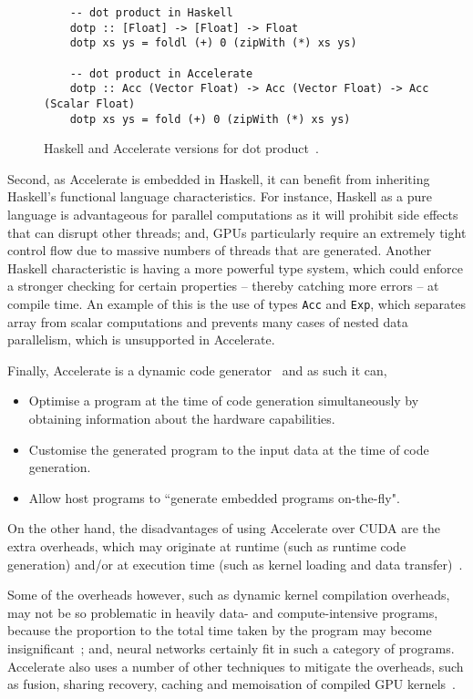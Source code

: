 \begin{figure}
  \begin{lstlisting}
    -- dot product in Haskell
    dotp :: [Float] -> [Float] -> Float
    dotp xs ys = foldl (+) 0 (zipWith (*) xs ys)
           
    -- dot product in Accelerate
    dotp :: Acc (Vector Float) -> Acc (Vector Float) -> Acc (Scalar Float)
    dotp xs ys = fold (+) 0 (zipWith (*) xs ys)
  \end{lstlisting}
  \caption{Haskell and Accelerate versions for dot product~\cite{McD13}.}
  \label{fig:dotp}
\end{figure}

Second, as Accelerate is embedded in Haskell, it can benefit from inheriting Haskell's functional language characteristics. For instance, Haskell as a pure language is advantageous for parallel computations as it will prohibit side effects that can disrupt other threads; and, GPUs particularly require an extremely tight control flow due to massive numbers of threads that are generated. Another Haskell characteristic is having a more powerful type system, which could enforce a stronger checking for certain properties -- thereby catching more errors -- at compile time. An example of this is the use of types \texttt{Acc} and \texttt{Exp}, which separates array from scalar computations and prevents many cases of nested data parallelism, which is unsupported in Accelerate.

Finally, Accelerate is a dynamic code generator~\cite{ChaKelLee11} and as such it can,
\begin{itemize}
\item Optimise a program at the time of code generation simultaneously by obtaining information about the hardware capabilities.
\item Customise the generated program to the input data at the time of code generation.
\item Allow host programs to ``generate embedded programs on-the-fly".
\end{itemize}

On the other hand, the disadvantages of using Accelerate over CUDA are the extra overheads, which may originate at runtime (such as runtime code generation) and/or at execution time (such as kernel loading and data transfer)~\cite{ChaKelLee11}. 

Some of the overheads however, such as dynamic kernel compilation overheads, may not be so problematic in heavily data- and compute-intensive programs, because the proportion to the total time taken by the program may become insignificant~\cite{ChaKelLee11}; and, neural networks certainly fit in such a category of programs. Accelerate also uses a number of other techniques to mitigate the overheads, such as fusion, sharing recovery, caching and memoisation of compiled GPU kernels~\cite{ChaKelLee11}.

